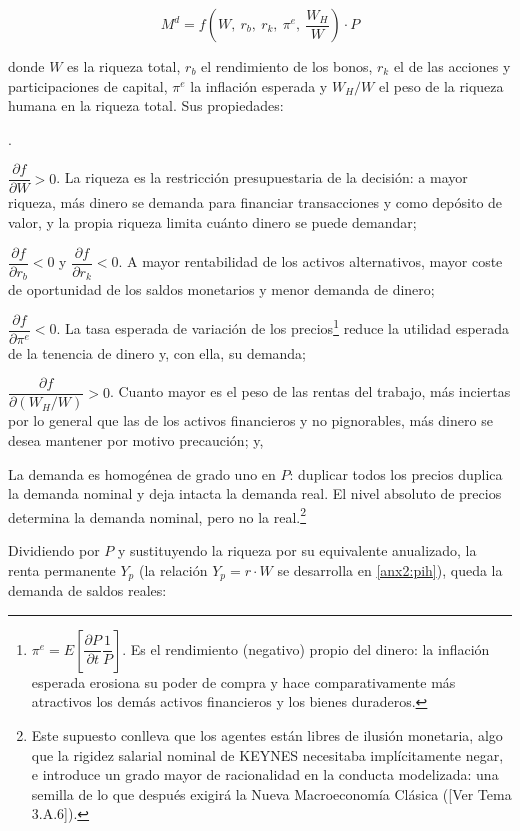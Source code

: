 \documentclass[10pt,a4paper]{article}
\newcounter{numitem}
\newenvironment{lnum}
      {\begin{list}{\arabic{numitem}.}{%
          \usecounter{numitem}%
          \setlength{\leftmargin}{1cm}%
          \setlength{\parskip}{3pt}%
          \setlength{\itemsep}{0pt}%
          \setlength{\parsep}{0pt}%
      }}
      {\end{list}}
\newcommand{\authorfont}[1]{{\fontfamily{EBGaramond-TLF}\selectfont #1}}
\begin{document}
$$M^{d}=f\!\left(W,\ r_b,\ r_k,\ \pi^{e},\ \frac{W_H}{W}\right)\cdot P$$

donde $W$ es la riqueza total, $r_b$ el rendimiento de los bonos, $r_k$ el de las acciones y participaciones de capital, $\pi^{e}$ la inflación esperada y $W_H/W$ el peso de la riqueza humana en la riqueza total. Sus propiedades:
\begin{lnum}
    \item $\dfrac{\partial f}{\partial W}>0$. La riqueza es la restricción presupuestaria de la decisión: a mayor riqueza, más dinero se demanda para financiar transacciones y como depósito de valor, y la propia riqueza limita cuánto dinero se puede demandar;
    \item $\dfrac{\partial f}{\partial r_b}<0$ y $\dfrac{\partial f}{\partial r_k}<0$. A mayor rentabilidad de los activos alternativos, mayor coste de oportunidad de los saldos monetarios y menor demanda de dinero;
    \item $\dfrac{\partial f}{\partial \pi^{e}}<0$. La tasa esperada de variación de los precios\footnote{%
        $\pi^{e}=E\!\left[\dfrac{\partial P}{\partial t}\dfrac{1}{P}\right]$. Es el rendimiento (negativo) propio del dinero: la inflación esperada erosiona su poder de compra y hace comparativamente más atractivos los demás activos financieros y los bienes duraderos.
    } reduce la utilidad esperada de la tenencia de dinero y, con ella, su demanda;
    \item $\dfrac{\partial f}{\partial (W_H/W)}>0$. Cuanto mayor es el peso de las rentas del trabajo, más inciertas por lo general que las de los activos financieros y no pignorables, más dinero se desea mantener por motivo precaución; y,
    \item La demanda es homogénea de grado uno en $P$: duplicar todos los precios duplica la demanda nominal y deja intacta la demanda real. El nivel absoluto de precios determina la demanda nominal, pero no la real.\footnote{%
        Este supuesto conlleva que los agentes están libres de ilusión monetaria, algo que la rigidez salarial nominal de KEYNES necesitaba implícitamente negar, e introduce un grado mayor de racionalidad en la conducta modelizada: una semilla de lo que después exigirá la Nueva Macroeconomía Clásica ([\authorfont{Ver Tema 3.A.6}]).
    }
\end{lnum}

Dividiendo por $P$ y sustituyendo la riqueza por su equivalente anualizado, la renta permanente $Y_p$ (la relación $Y_p=r\cdot W$ se desarrolla en \ref{anx2:pih}), queda la demanda de saldos reales:
\end{document}
